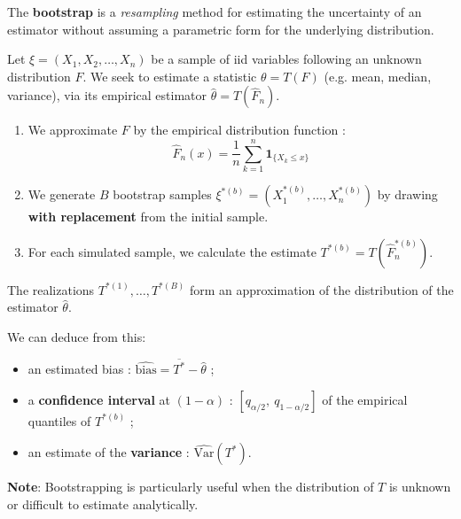 \begin{f}
	
	The \textbf{bootstrap} is a \textit{resampling} method for estimating the uncertainty of an estimator without assuming a parametric form for the underlying distribution.
	
	Let $\xi = (X_1, X_2, \ldots, X_n)$ be a sample of iid variables following an unknown distribution $F$. We seek to estimate a statistic $\theta = T(F)$ (e.g. mean, median, variance), via its empirical estimator $\hat{\theta} = T(\hat{F}_n)$.
	
	\begin{enumerate}
		\item We approximate $F$ by the empirical distribution function :
		\[
		\hat{F}_n(x) = \frac{1}{n} \sum_{k=1}^n \mathbf{1}_{\{X_k \le x\}}
		\]
		
		\item We generate $B$ bootstrap samples $\xi^{\ast(b)} = (X_1^{\ast(b)}, \ldots, X_n^{\ast(b)})$ by drawing \textbf{with replacement} from the initial sample.
		
		\item For each simulated sample, we calculate the estimate $T^{\ast(b)} = T(\hat{F}_n^{\ast(b)})$.
	\end{enumerate}
	
	The realizations $T^{\ast(1)}, \ldots, T^{\ast(B)}$ form an approximation of the distribution of the estimator $\hat{\theta}$.
	
	We can deduce from this:
	\begin{itemize}[nosep]
		\item an estimated bias : $\widehat{\text{bias}} = \overline{T^\ast} - \hat{\theta}$ ;
		\item a \textbf{confidence interval} at $(1-\alpha)$ : $[q_{\alpha/2},\ q_{1 - \alpha/2}]$ of the empirical quantiles of $T^{\ast(b)}$ ;
		\item an estimate of the \textbf{variance} : $\widehat{\mathrm{Var}}(T^\ast)$.
	\end{itemize}
	
	\textbf{Note}: Bootstrapping is particularly useful when the distribution of $T$ is unknown or difficult to estimate analytically.
	
\end{f}
